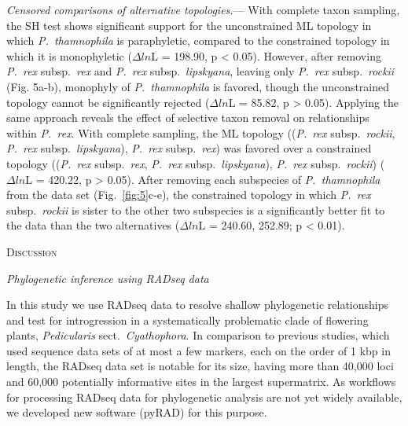 \documentclass[12pt,letterpaper]{article}
\renewcommand{\section}[1]{%
\bigskip
\begin{center}
\begin{Large}
\normalfont\scshape #1
\medskip
\end{Large}
\end{center}}
\renewcommand{\subsection}[1]{%
\bigskip
\begin{center}
\begin{large}
\normalfont\itshape #1
\end{large}
\end{center}}
\renewcommand{\subsubsection}[1]{%
\vspace{2ex}
\noindent
\textit{#1.}---}
\begin{document}
\subsubsection{Censored comparisons of alternative topologies}
With complete taxon sampling, the SH test 
shows significant support for the
unconstrained ML topology in which \emph{P.~thamnophila} is
paraphyletic, compared to the constrained topology in which it is
monophyletic ($\Delta ln$L = 198.90, p < 0.05). 
However, after removing \emph{P.~rex} subsp.\ \emph{rex} and \emph{P.~rex} subsp.\
\emph{lipskyana}, leaving only \emph{P.~rex} subsp.\ \emph{rockii}
(Fig. 5a-b), monophyly of \emph{P.~thamnophila} is favored, 
though the unconstrained topology cannot be significantly rejected 
($\Delta ln$L = 85.82, p > 0.05).
Applying the same approach reveals the effect of selective taxon
removal on relationships within \emph{P.~rex}. With complete sampling,
the ML topology ((\emph{P.~rex} subsp.\ \emph{rockii}, \emph{P.~rex}
subsp.\ \emph{lipskyana}), \emph{P.~rex} subsp.\ \emph{rex}) was
favored over a constrained topology ((\emph{P.~rex} subsp.\
\emph{rex}, \emph{P.~rex} subsp.\ \emph{lipskyana}), \emph{P.~rex}
subsp.\ \emph{rockii}) ($\Delta ln$L = 420.22, p > 0.05). After
removing each subspecies of \emph{P.~thamnophila} from the data set
(Fig.~\ref{fig:5}c-e), the constrained topology in which \emph{P.~rex}
subsp.\ \emph{rockii} is sister to the other two subspecies is a
significantly better fit to the data than the two alternatives
($\Delta ln$L = 240.60, 252.89; p < 0.01).

\section{Discussion}

\subsection{Phylogenetic inference using RADseq data}
In this study we use RADseq data to resolve shallow phylogenetic
relationships and test for introgression in a systematically
problematic clade of flowering plants, \emph{Pedicularis} sect.\
\emph{Cyathophora}. In comparison to previous studies, which used
sequence data sets of at most a few markers, each on the order of 1
kbp in length, the RADseq data set is notable for its size, having
more than 40,000 loci and 60,000 potentially informative sites in the
largest supermatrix. 
As workflows for processing RADseq data for
phylogenetic analysis are not yet widely available, we developed new
software (pyRAD) for this purpose.
\end{document}
